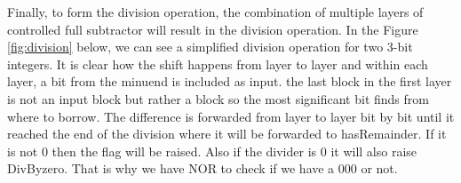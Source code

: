 Finally, to form the division operation, the combination of multiple layers of controlled full subtractor will result in the division operation. In the Figure \ref{fig:division} below, we can see a simplified division operation for two 3-bit integers. It is clear how the shift happens from layer to layer and within each layer, a bit from the minuend is included as input. the last block in the first layer is not an input block but rather a block so the most significant bit finds from where to borrow. The difference is forwarded from layer to layer bit by bit until it reached the end of the division where it will be forwarded to hasRemainder. If it is not 0 then the flag will be raised. Also if the divider is 0 it will also raise DivByzero. That is why we have NOR to check if we have a 000 or not.

